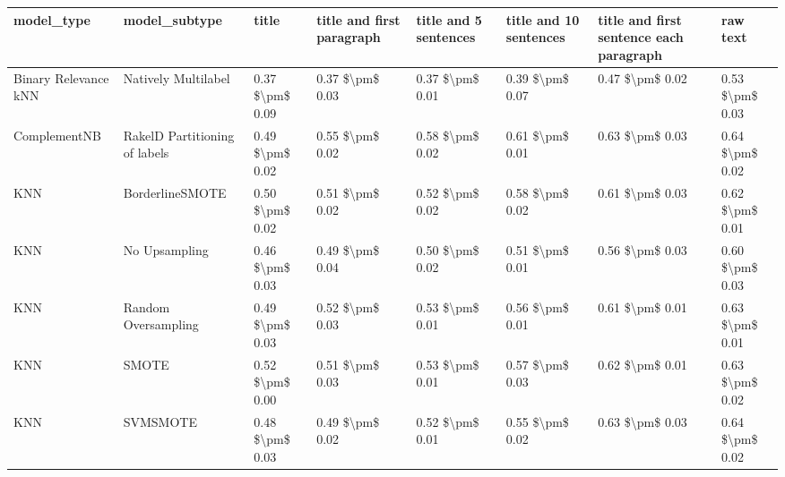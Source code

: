 \begin{tabular}{llllllll}
\toprule
                     model\_type &                 model\_subtype &           title & title and first paragraph & title and 5 sentences & title and 10 sentences & title and first sentence each paragraph &            raw text \\
\midrule
           Binary Relevance kNN &           Natively Multilabel & 0.37 \$\textbackslash pm\$ 0.09 &           0.37 \$\textbackslash pm\$ 0.03 &       0.37 \$\textbackslash pm\$ 0.01 &        0.39 \$\textbackslash pm\$ 0.07 &                         0.47 \$\textbackslash pm\$ 0.02 &     0.53 \$\textbackslash pm\$ 0.03 \\
                   ComplementNB & RakelD Partitioning of labels & 0.49 \$\textbackslash pm\$ 0.02 &           0.55 \$\textbackslash pm\$ 0.02 &       0.58 \$\textbackslash pm\$ 0.02 &        0.61 \$\textbackslash pm\$ 0.01 &                         0.63 \$\textbackslash pm\$ 0.03 &     0.64 \$\textbackslash pm\$ 0.02 \\
                            KNN &               BorderlineSMOTE & 0.50 \$\textbackslash pm\$ 0.02 &           0.51 \$\textbackslash pm\$ 0.02 &       0.52 \$\textbackslash pm\$ 0.02 &        0.58 \$\textbackslash pm\$ 0.02 &                         0.61 \$\textbackslash pm\$ 0.03 &     0.62 \$\textbackslash pm\$ 0.01 \\
                            KNN &                 No Upsampling & 0.46 \$\textbackslash pm\$ 0.03 &           0.49 \$\textbackslash pm\$ 0.04 &       0.50 \$\textbackslash pm\$ 0.02 &        0.51 \$\textbackslash pm\$ 0.01 &                         0.56 \$\textbackslash pm\$ 0.03 &     0.60 \$\textbackslash pm\$ 0.03 \\
                            KNN &           Random Oversampling & 0.49 \$\textbackslash pm\$ 0.03 &           0.52 \$\textbackslash pm\$ 0.03 &       0.53 \$\textbackslash pm\$ 0.01 &        0.56 \$\textbackslash pm\$ 0.01 &                         0.61 \$\textbackslash pm\$ 0.01 &     0.63 \$\textbackslash pm\$ 0.01 \\
                            KNN &                         SMOTE & 0.52 \$\textbackslash pm\$ 0.00 &           0.51 \$\textbackslash pm\$ 0.03 &       0.53 \$\textbackslash pm\$ 0.01 &        0.57 \$\textbackslash pm\$ 0.03 &                         0.62 \$\textbackslash pm\$ 0.01 &     0.63 \$\textbackslash pm\$ 0.02 \\
                            KNN &                      SVMSMOTE & 0.48 \$\textbackslash pm\$ 0.03 &           0.49 \$\textbackslash pm\$ 0.02 &       0.52 \$\textbackslash pm\$ 0.01 &        0.55 \$\textbackslash pm\$ 0.02 &                         0.63 \$\textbackslash pm\$ 0.03 &     0.64 \$\textbackslash pm\$ 0.02 \\

\end{tabular}
